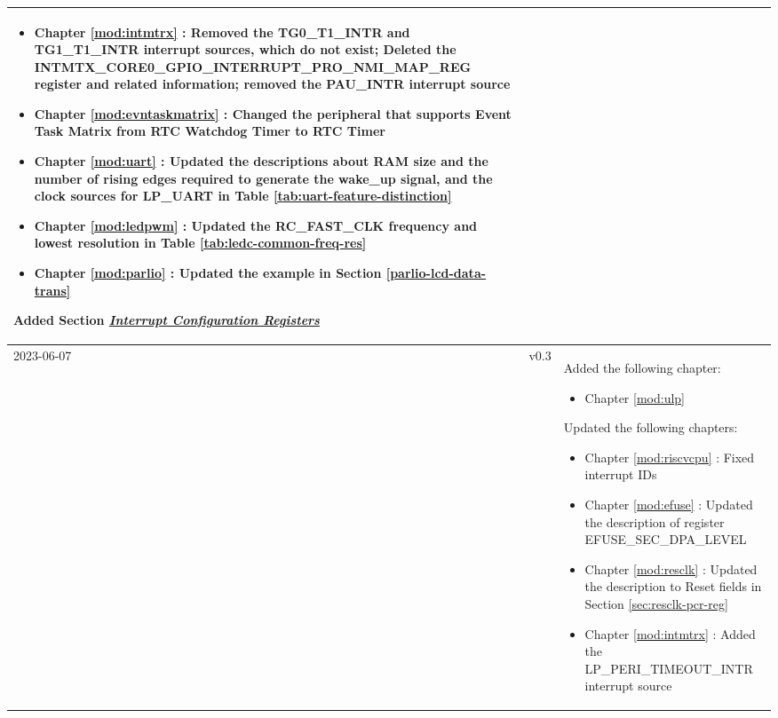 \begin{longtable}[l]{ | m{2cm} | m{1.5cm} | m{12cm} | }
\begin{itemize}
        \item Chapter \ref{mod:intmtrx} \textit{\nameref{mod:intmtrx}}: Removed the TG0\_T1\_INTR and TG1\_T1\_INTR interrupt sources, which do not exist; Deleted the INTMTX\_CORE0\_GPIO\_INTERRUPT\_PRO\_NMI\_MAP\_REG register and related information; removed the PAU\_INTR interrupt source %
        \item Chapter \ref{mod:evntaskmatrix} \textit{\nameref{mod:evntaskmatrix}}: Changed the peripheral that supports Event Task Matrix from RTC Watchdog Timer to RTC Timer %
        \item Chapter \ref{mod:uart} \textit{\nameref{mod:uart}}: Updated the descriptions about RAM size and the number of rising edges required to generate the wake\_up signal, and the clock sources for LP\_UART in Table \ref{tab:uart-feature-distinction} %
        \item Chapter \ref{mod:ledpwm} \textit{\nameref{mod:ledpwm}}: Updated the RC\_FAST\_CLK frequency and lowest resolution in Table \ref{tab:ledc-common-freq-res}  %
        \item Chapter \ref{mod:parlio} \textit{\nameref{mod:parlio}}: Updated the example in Section \ref{parlio-lcd-data-trans} \textit{\nameref{parlio-lcd-data-trans}}
    \end{itemize}
    Added Section \hyperref[interrupt-config-registers]{\textit{Interrupt Configuration Registers}}
    \\\hline
    2023-06-07          & v0.3 &
    Added the following chapter:
        \begin{itemize}
            \item Chapter \ref{mod:ulp} \textit{\nameref{mod:ulp}}
        \end{itemize}
    Updated the following chapters:
    \begin{itemize}
        \item Chapter \ref{mod:riscvcpu} \textit{\nameref{mod:riscvcpu}}: Fixed interrupt IDs %
        \item Chapter \ref{mod:efuse} \textit{\nameref{mod:efuse}}: Updated the description of register EFUSE\_SEC\_DPA\_LEVEL %
        \item Chapter \ref{mod:resclk} \textit{\nameref{mod:resclk}}: Updated the description to Reset fields in Section \ref{sec:resclk-pcr-reg} \textit{\nameref{sec:resclk-pcr-reg}} %
        \item Chapter \ref{mod:intmtrx} \textit{\nameref{mod:intmtrx}}: Added the LP\_PERI\_TIMEOUT\_INTR interrupt source %

\end{itemize}
\end{longtable}
